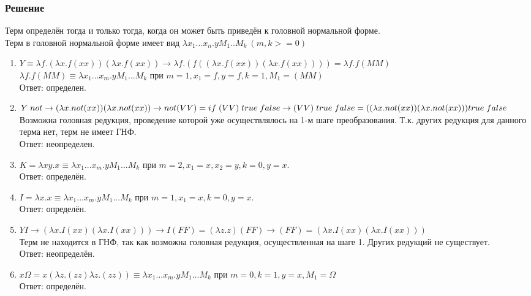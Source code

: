 \documentclass[10pt,a4paper]{article}
\begin{document}
\subsubsection*{Решение}
Терм определён тогда и только тогда, когда он может быть приведён к
головной нормальной форме.\\
Терм в головной нормальной форме имеет вид $\lambda x_1
... x_n.yM_1..M_k\ (m, k >= 0)$ 
\begin{enumerate}

\item
$Y \equiv \lambda f.(\lambda x.f(xx))(\lambda x.f(xx))
\rightarrow \lambda f.(f((\lambda x.f(xx))(\lambda x.f(xx)))) =
\lambda f.f(MM)$  \\

$\lambda f.f(MM) \equiv \lambda x_1...x_m.yM_1...M_k $
при $m = 1, x_1 = f, 
y = f, k = 1, M_1 = (MM)$ \\
Ответ: определен. 

\item
$Y \mspace{5mu} not \rightarrow (\lambda x.not(xx)) (\lambda
x.not(xx)) \rightarrow not (VV) =  
if \mspace{5mu} (VV) \mspace{5mu} true \mspace{5mu} false \rightarrow
\\ (VV) \mspace{5mu} true \mspace{5mu} 
false = ((\lambda x.not(xx)) (\lambda x.not(xx))) true \mspace{5mu} false$ \\
Возможна головная редукция, проведение которой уже осуществлялось на
1-м шаге преобразования. Т.к. других редукция для данного терма нет,
терм не имеет ГНФ. \\ 
Ответ: неопределен.

\item
$K = \lambda xy.x \equiv \lambda x_1...x_m.yM_1...M_k $
при $m = 2, x_1 = x, x_2 = y, k = 0, y = x$. \\
Ответ: определён.

\item
$I = \lambda x.x \equiv \lambda x_1...x_m.yM_1...M_k $
при $m = 1, x_1 = x, k = 0, y = x$. \\
Ответ: определён.
\item
$YI \rightarrow (\lambda x.I(xx)(\lambda x.I(xx))) \rightarrow I(FF) =
(\lambda z.z)(FF) \rightarrow 
(FF) = (\lambda x.I(xx)(\lambda x.I(xx)))$ \\
Терм не находится в ГНФ, так как возможна головная редукция,
осуществленная на шаге 1. Других редукций не существует. \\ 
Ответ: неопределён.

\item
 $x \Omega = x(\lambda z.(zz)\lambda z.(zz)) \equiv \lambda
 x_1...x_m.yM_1...M_k $ 
при $m = 0, k = 1, y = x, M_1 = \Omega$ \\
Ответ: определён.


\end{enumerate}
\end{document}
